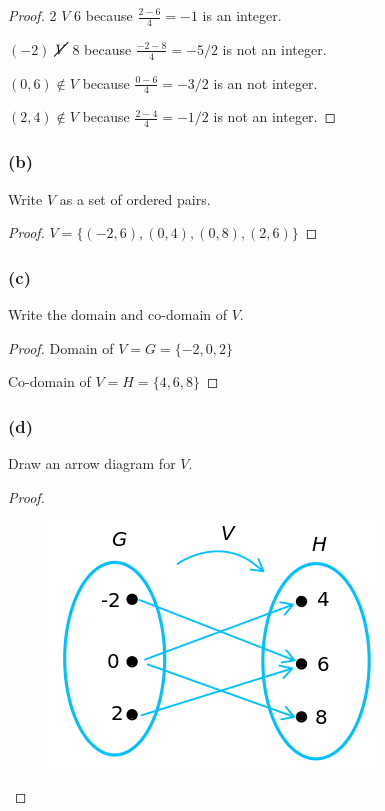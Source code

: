 \documentclass[14pt]{extarticle}
\newcommand{\dps}{\displaystyle}
\begin{document}
\begin{proof}
2 $V$ 6 because $\dps\frac{2-6}{4} = -1$ is an integer.

$(-2)$ $\cancel{V}$ 8 because $\dps\frac{-2-8}{4} = -5/2$ is not an integer.

$(0, 6) \notin V$ because $\dps\frac{0-6}{4} = -3/2$ is an not integer.

$(2, 4) \notin V$ because $\dps\frac{2-4}{4} = -1/2$ is not an integer.

\end{proof}

\subsubsection{(b)}
Write $V$ as a set of ordered pairs.

\begin{proof}
$V = \{(-2, 6), (0, 4), (0, 8), (2, 6)\}$
\end{proof}

\subsubsection{(c)}
Write the domain and co-domain of $V$.

\begin{proof}
Domain of $V = G = \{-2, 0, 2\}$

Co-domain of $V = H = \{4, 6, 8\}$
\end{proof}

\subsubsection{(d)}
Draw an arrow diagram for $V$.

\begin{proof}
\begin{figure}[ht!]
\centering
\includegraphics[scale=0.5]{../images/1.3.4.png}
\end{figure}
\end{proof}
\end{document}
